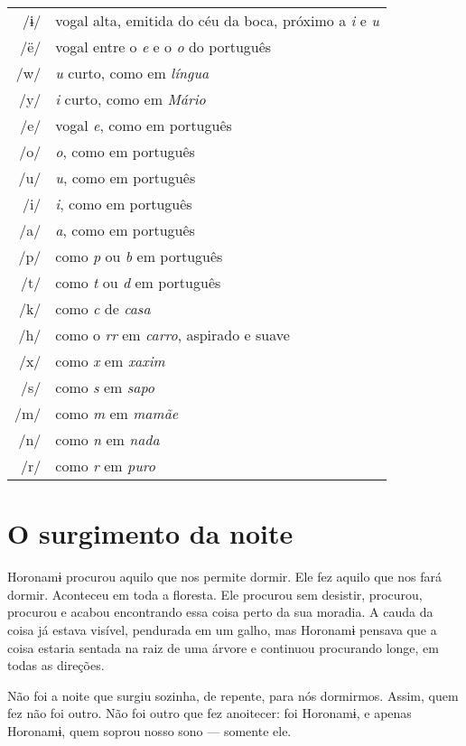 \begin{tabular}{rl}
/ɨ/ & vogal alta, emitida do céu da boca, próximo a \textit{i} e \textit{u}\\
/ë/ & vogal entre o \textit{e} e o \textit{o} do português\\
/w/ & \textit{u} curto, como em \textit{língua}\\
/y/ & \textit{i} curto, como em \textit{Mário}\\
/e/ & vogal \textit{e}, como em português\\
/o/ & \textit{o}, como em português\\
/u/ & \textit{u}, como em português\\
/i/ & \textit{i}, como em português\\
/a/ & \textit{a}, como em português\\
/p/ & como \textit{p} ou \textit{b} em português\\
/t/ & como \textit{t} ou \textit{d} em português\\
/k/ & como \textit{c} de \textit{casa}\\
/h/ & como o \textit{rr} em \textit{carro}, aspirado e suave\\
/x/ & como \textit{x} em \textit{xaxim}\\
/s/ & como \textit{s} em \textit{sapo}\\
/m/ & como \textit{m} em \textit{mamãe}\\
/n/ & como \textit{n} em \textit{nada}\\
/r/ & como \textit{r} em \textit{puro}\\
\end{tabular}

\chapter{O surgimento da noite}

Horonamɨ procurou aquilo que nos permite dormir. Ele fez aquilo que nos
fará dormir. Aconteceu em toda a floresta. Ele procurou sem desistir,
procurou, procurou e acabou encontrando essa coisa perto da sua moradia.
A cauda da coisa já estava visível, pendurada em um galho, mas Horonamɨ
pensava que a coisa estaria sentada na raiz de uma árvore e continuou
procurando longe, em todas as direções. 

Não foi a noite que surgiu sozinha, de repente, para nós dormirmos.
Assim, quem fez não foi outro. Não foi outro que fez anoitecer: foi
Horonamɨ, e apenas Horonamɨ, quem soprou nosso sono --- somente ele. 

